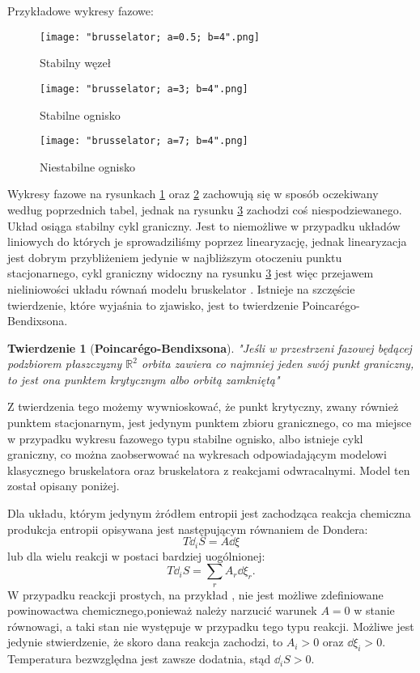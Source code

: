 \documentclass[10pt, a4paper, twoside, onecolumn]{article}
\numberwithin{equation}{section}
\newtheorem*{theorem}{Twierdzenie}
\begin{document}
	Przykładowe wykresy fazowe:
	\begin{figure}[H]\label{stabilny wezel}
		\centering
		\texttt{[image: "brusselator; a=0.5; b=4".png]}
		\caption{Stabilny węzeł}
	\end{figure}
	\begin{figure}[H]\label{stabilne ognisko}
		\centering
		\texttt{[image: "brusselator; a=3; b=4".png]}
		\caption{Stabilne ognisko}
	\end{figure}
	\begin{figure}[H]\label{niestabilne ognisko}
		\centering
		\texttt{[image: "brusselator; a=7; b=4".png]}
		\caption{Niestabilne ognisko}
	\end{figure}
	Wykresy fazowe na rysunkach \ref{stabilny wezel} oraz \ref{stabilne ognisko} zachowują się w sposób oczekiwany według poprzednich tabel, jednak na rysunku \ref{niestabilne ognisko} zachodzi coś niespodziewanego. Układ osiąga stabilny cykl graniczny. Jest to niemożliwe w przypadku układów liniowych do których je sprowadziliśmy poprzez linearyzację, jednak linearyzacja jest dobrym przybliżeniem jedynie w najbliższym otoczeniu punktu stacjonarnego, cykl graniczny widoczny na rysunku \ref{niestabilne ognisko} jest więc przejawem nieliniowości układu równań modelu bruskelator \cite{orlik}. Istnieje na szczęście twierdzenie, które wyjaśnia to zjawisko, jest to twierdzenie Poincar\'{e}go-Bendixsona. \par
	\begin{theorem}[\textbf{Poincar\'{e}go-Bendixsona}]
		"Jeśli w przestrzeni fazowej będącej podzbiorem płaszczyzny \(\mathbb{R}^{2}\) orbita zawiera co najmniej jeden swój punkt graniczny, to jest ona punktem krytycznym albo orbitą zamkniętą" \cite{palczewski}
	\end{theorem}
	Z twierdzenia tego możemy wywnioskować, że punkt krytyczny, zwany również punktem stacjonarnym, jest jedynym punktem zbioru granicznego, co ma miejsce w przypadku wykresu fazowego typu stabilne ognisko, albo istnieje cykl graniczny, co można zaobserwować na wykresach odpowiadającym modelowi klasycznego bruskelatora oraz bruskelatora z reakcjami odwracalnymi. Model ten został opisany poniżej. \par
	Dla układu, którym jedynym żródłem entropii jest zachodząca reakcja chemiczna produkcja entropii opisywana jest następującym równaniem de Dondera:
	\begin{equation}\label{de donder}
		T\dd_{i}S=A\dd{\xi}
	\end{equation}
	lub dla wielu reakcji w postaci bardziej uogólnionej: 
	\begin{equation}\label{de donder ogolny}
		T\dd_{i}S=\sum_{r}A_{r}\dd{\xi_{r}}.
	\end{equation}
	W przypadku reackcji prostych, na przykład , nie jest możliwe zdefiniowane powinowactwa chemicznego,ponieważ należy narzucić warunek \(A=0\) w stanie równowagi, a taki stan nie występuje w przypadku tego typu reakcji. Możliwe jest jedynie stwierdzenie, że skoro dana reakcja zachodzi, to \(A_{i}>0\) oraz \(\dd{\xi_{i}}>0\). Temperatura bezwzględna jest zawsze dodatnia, stąd \(\dd_{i}S>0\). \par
\end{document}
